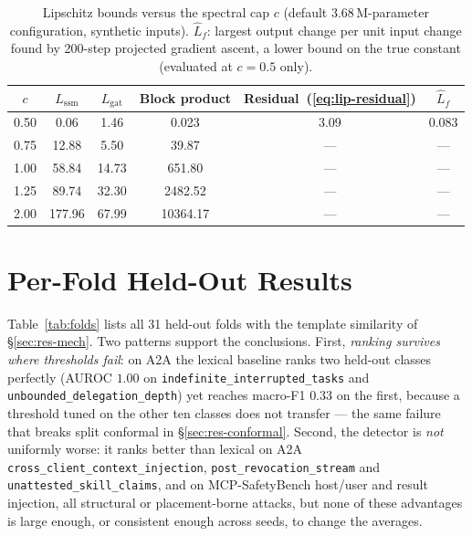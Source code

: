 \documentclass[conference,compsoc]{IEEEtran}
\begin{document}
\begin{table}[!tbp]
\centering
\caption{Lipschitz bounds versus the spectral cap $c$ (default 3.68\,M-parameter configuration, synthetic inputs). $\hat L_{f}$: largest output change per unit input change found by 200-step projected gradient ascent, a lower bound on the true constant (evaluated at $c=0.5$ only).}
\label{tab:lipsweep}
\footnotesize
\renewcommand{\arraystretch}{1.1}
\setlength{\tabcolsep}{3pt}
\begin{tabular}{@{}cccccc@{}}
\toprule
$c$ & $L_{\text{ssm}}$ & $L_{\text{gat}}$ & Block product & Residual~(\ref{eq:lip-residual}) & $\hat L_{f}$ \\
\midrule
0.50 &   0.06 &   1.46 &   0.023 & 3.09 & 0.083 \\
0.75 &  12.88 &   5.50 &  39.87 & --- & --- \\
1.00 &  58.84 &  14.73 & 651.80 & --- & --- \\
1.25 &  89.74 &  32.30 & 2482.52 & --- & --- \\
2.00 & 177.96 &  67.99 & 10364.17 & --- & --- \\
\bottomrule
\end{tabular}
\end{table}

\section{Per-Fold Held-Out Results}
\label{app:folds}
Table~\ref{tab:folds} lists all 31 held-out folds with the template similarity of \S\ref{sec:res-mech}. Two patterns support the conclusions. First, \emph{ranking survives where thresholds fail}: on A2A the lexical baseline ranks two held-out classes perfectly (AUROC $1.00$ on \texttt{indefinite\_interrupted\_tasks} and \texttt{unbounded\_delegation\_depth}) yet reaches macro-F1 $0.33$ on the first, because a threshold tuned on the other ten classes does not transfer --- the same failure that breaks split conformal in \S\ref{sec:res-conformal}. Second, the detector is \emph{not} uniformly worse: it ranks better than lexical on A2A \texttt{cross\_client\_context\_injection}, \texttt{post\_revocation\_stream} and \texttt{unattested\_skill\_claims}, and on MCP-SafetyBench host/user and result injection, all structural or placement-borne attacks, but none of these advantages is large enough, or consistent enough across seeds, to change the averages.
\end{document}
